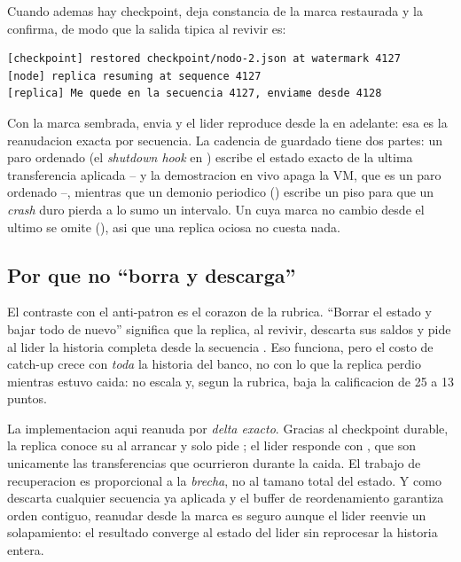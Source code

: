 Cuando ademas hay checkpoint,  deja constancia de
la marca restaurada y  la confirma, de modo que la salida
tipica al revivir es:

\begin{lstlisting}[language=none,caption={Salida tipica al revivir el proceso de una replica}]
[checkpoint] restored checkpoint/nodo-2.json at watermark 4127
[node] replica resuming at sequence 4127
[replica] Me quede en la secuencia 4127, enviame desde 4128
\end{lstlisting}

Con la marca  sembrada,  envia
 y el lider reproduce desde la  en adelante: esa
es la reanudacion exacta por secuencia. La cadencia de guardado tiene dos partes:
un paro ordenado (el \emph{shutdown hook} en ) escribe el estado
exacto de la ultima transferencia aplicada -- y la demostracion en vivo apaga la VM,
que es un paro ordenado --, mientras que un demonio periodico
() escribe un piso para que un \emph{crash} duro
pierda a lo sumo un intervalo. Un  cuya marca no cambio desde el
ultimo se omite (), asi que una replica ociosa no cuesta
nada.

\subsection{Por que no ``borra y descarga''}

El contraste con el anti-patron es el corazon de la rubrica. ``Borrar el estado y
bajar todo de nuevo'' significa que la replica, al revivir, descarta sus saldos y
pide al lider la historia completa desde la secuencia . Eso funciona,
pero el costo de catch-up crece con \emph{toda} la historia del banco, no con lo
que la replica perdio mientras estuvo caida: no escala y, segun la rubrica, baja la
calificacion de 25 a 13 puntos.

La implementacion aqui reanuda por \emph{delta exacto}. Gracias al checkpoint
durable, la replica conoce su  al arrancar y solo pide
; el lider responde con ,
que son unicamente las transferencias  que
ocurrieron durante la caida. El trabajo de recuperacion es proporcional a la
\emph{brecha}, no al tamano total del estado. Y como 
descarta cualquier secuencia ya aplicada y el buffer de reordenamiento garantiza
orden contiguo, reanudar desde la marca es seguro aunque el lider reenvie un
solapamiento: el resultado converge al estado del lider sin reprocesar la historia
entera.
